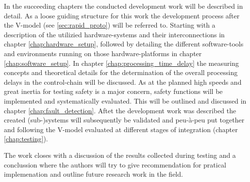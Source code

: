 \documentclass[ExampleMasters.tex]{subfiles}
\begin{document}
In the succeeding chapters the conducted development work will be described in detail. As a loose guiding structure for this work the development process after the V-model (see \ref{sec:rapid_proto}) will be referred to. Starting with a description of the utilizied hardware-systems and their interconnections in chapter \ref{chap:hardware_setup}, followed by detailing the different software-tools and environments running on those hardware-platforms in chapter \ref{chap:software_setup}. In chapter \ref{chap:processing_time_delay} the measuring concepts and theoretical details for the determination of the overall processing delays in the control-chain will be discussed. As at the planned high speeds and great inertia for testing safety is a major concern, safety functions will be implemented and systematically evaluated. This will be outlined and discussed in chapter \ref{chap:fault_detection}. Aftet the development work was described the created (sub-)systems will subsequently be validated and peu-\`{a}-peu put together and following the V-model evaluated at different stages of integration (chapter \ref{chap:testing}). 

The work closes with a discussion of the results collected during testing and a conclussion where the authors will try to give recommendation for pratical implemenation and outline future research work in the field.
\end{document}
